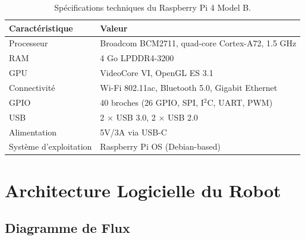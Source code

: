 \begin{table}[H]
\centering
\caption{Spécifications techniques du Raspberry Pi 4 Model B.}
\label{tab:rpi_specs}
\renewcommand{\arraystretch}{1.3}
\begin{tabular}{|l|l|}
\hline
\rowcolor{stellantisblue!15}
\textbf{Caractéristique} & \textbf{Valeur} \\
\hline
Processeur & Broadcom BCM2711, quad-core Cortex-A72, 1.5 GHz \\
\hline
RAM & 4 Go LPDDR4-3200 \\
\hline
GPU & VideoCore VI, OpenGL ES 3.1 \\
\hline
Connectivité & Wi-Fi 802.11ac, Bluetooth 5.0, Gigabit Ethernet \\
\hline
GPIO & 40 broches (26 GPIO, SPI, I$^2$C, UART, PWM) \\
\hline
USB & 2 $\times$ USB 3.0, 2 $\times$ USB 2.0 \\
\hline
Alimentation & 5V/3A via USB-C \\
\hline
Système d'exploitation & Raspberry Pi OS (Debian-based) \\
\hline
\end{tabular}
\end{table}

\section{Architecture Logicielle du Robot}

\subsection{Diagramme de Flux}


